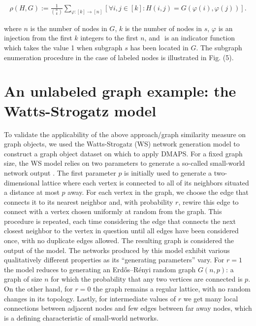 \begin{align}
  \label{eqn:homdenG}
  \rho(H,G) := \frac{1}{{n\choose k}} \!  \sum_{\varphi:[k] \to [n]} \!
  \left[ \forall  i, j \in [k] \! : \! H(i,j) \! = \! G(\varphi(i),
  \varphi(j)) \right].
\end{align}

where $n$ is the number of nodes in $G$, $k$ is the number of nodes in
$s$, $\varphi$ is an injection from the first $k$ integers to the
first $n$, and $\!$ is an indicator function which takes the value 1
when subgraph $s$ has been located in $G$. The subgraph enumeration
procedure in the case of labeled nodes is illustrated in Fig. (5).

\section{An unlabeled graph example: the Watts-Strogatz model}

To validate the applicability of the above approach/graph similarity
measure on graph objects, we used the Watts-Strogatz (WS) network
generation model to construct a graph object dataset on which to apply
DMAPS. For a fixed graph size, the WS model relies on two parameters
to generate a so-called small-world network output
\cite{watts_collective_1998}. The first parameter $p$ is initially
used to generate a two-dimensional lattice where each vertex is
connected to all of its neighbors situated a distance at most $p$
away. For each vertex in the graph, we choose the edge that connects
it to its nearest neighbor and, with probability $r$, rewire this edge
to connect with a vertex chosen uniformly at random from the
graph. This procedure is repeated, each time considering the edge that
connects the next closest neighbor to the vertex in question until all
edges have been considered once, with no duplicate edges allowed. The
resulting graph is considered the output of the model. The networks
produced by this model exhibit various qualitatively different
properties as its “generating parameters” vary. For $r=1$ the model
reduces to generating an Erdős–Rényi random graph $G(n,p)$: a graph of
size $n$ for which the probability that any two vertices are connected
is $p$. On the other hand, for $r=0$ the graph remains a regular
lattice, with no random changes in its topology. Lastly, for
intermediate values of $r$ we get many local connections between
adjacent nodes and few edges between far away nodes, which is a
defining characteristic of small-world networks.


